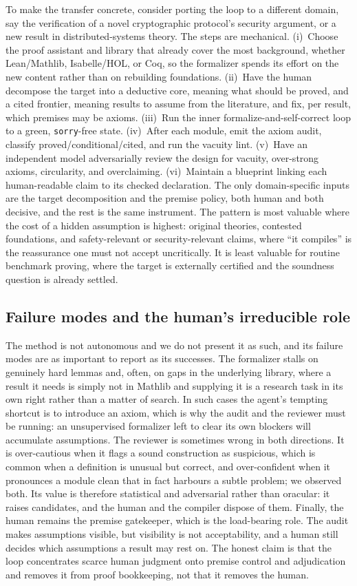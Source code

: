 \documentclass[11pt]{article}
\begin{document}
To make the transfer concrete, consider porting the loop to a different domain, say the verification
of a novel cryptographic protocol's security argument, or a new result in distributed-systems theory.
The steps are mechanical. (i)~Choose the proof assistant and library that already cover the most
background, whether Lean/Mathlib, Isabelle/HOL, or Coq, so the formalizer spends its effort on the new
content rather than on rebuilding foundations. (ii)~Have the human decompose the target into a
deductive core, meaning what should be proved, and a cited frontier, meaning results to assume from the
literature, and fix, per result, which premises may be axioms. (iii)~Run the inner
formalize-and-self-correct loop to a green, \texttt{sorry}-free state. (iv)~After each module, emit the
axiom audit, classify proved/conditional/cited, and run the vacuity lint. (v)~Have an independent model
adversarially review the design for vacuity, over-strong axioms, circularity, and overclaiming.
(vi)~Maintain a blueprint linking each human-readable claim to its checked declaration. The only
domain-specific inputs are the target decomposition and the premise policy, both human and both
decisive, and the rest is the same instrument. The pattern is most valuable where the cost of a hidden
assumption is highest: original theories, contested foundations, and safety-relevant or
security-relevant claims, where ``it compiles'' is the reassurance one must not accept uncritically. It
is least valuable for routine benchmark proving, where the target is externally certified and the
soundness question is already settled.

\subsection{Failure modes and the human's irreducible role}

The method is not autonomous and we do not present it as such, and its failure modes are as important
to report as its successes. The formalizer stalls on genuinely hard lemmas and, often, on gaps in the
underlying library, where a result it needs is simply not in Mathlib and supplying it is a research
task in its own right rather than a matter of search. In such cases the agent's tempting shortcut is to
introduce an axiom, which is why the audit and the reviewer must be running: an unsupervised formalizer
left to clear its own blockers will accumulate assumptions. The reviewer is sometimes wrong in both
directions. It is over-cautious when it flags a sound construction as suspicious, which is common when a
definition is unusual but correct, and over-confident when it pronounces a module clean that in fact
harbours a subtle problem; we observed both. Its value is therefore statistical and adversarial rather
than oracular: it raises candidates, and the human and the compiler dispose of them. Finally, the human
remains the premise gatekeeper, which is the load-bearing role. The audit makes assumptions visible,
but visibility is not acceptability, and a human still decides which assumptions a result may rest on.
The honest claim is that the loop concentrates scarce human judgment onto premise control and
adjudication and removes it from proof bookkeeping, not that it removes the human.
\end{document}
